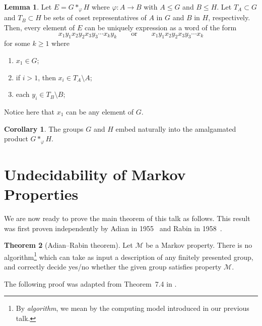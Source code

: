 \documentclass[11pt,a4paper,reqno]{amsart}
\theoremstyle{plain}
\theoremstyle{definition}
\newtheorem{theorem}{Theorem}[section]
\newtheorem{lemma}[theorem]{Lemma}
\newtheorem{corollary}{Corollary}[theorem]
\theoremstyle{definition}
\renewcommand\leq\leqslant
\renewcommand\geq\geqslant
\begin{document}
\begin{lemma}\label{lem:amalgamated-normal-form}
	Let $E = G *_\varphi H$ where $\varphi\colon A\to B$ with $A\leq G$ and $B \leq H$.
	Let $T_A\subset G$ and $T_B \subset H$ be sets of coset representatives of $A$ in $G$ and $B$ in $H$, respectively.
	Then, every element of $E$ can be uniquely expression as a word of the form
	\[
		x_1 y_1 x_2 y_2 x_3 y_3 \cdots x_k y_k
		\qquad\text{or}\qquad
		x_1 y_1 x_2 y_2 x_3 y_3 \cdots x_k
	\]
	for some $k \geq 1$ where
	\begin{enumerate}
		\item $x_1 \in G$;
		\item if $i > 1$, then $x_i \in T_A\setminus A$;
		\item each $y_i \in T_B\setminus B$;
	\end{enumerate}
	Notice here that $x_1$ can be any element of $G$.
\end{lemma}
\begin{corollary}\label{cor:amal-natural-embed}
	The groups $G$ and $H$ embed naturally into the amalgamated product $G*_\varphi H$.
\end{corollary}

\section{Undecidability of Markov Properties}

We are now ready to prove the main theorem of this talk as follows.
This result was first proven independently by Adian in 1955~\cite{adyan1955algorithmic} and Rabin in 1958~\cite{rabin1958recursive}.

\begin{theorem}[Adian–Rabin theorem]\label{thm:aiden-raben}
	Let $\mathcal M$ be a Markov property.
	There is no algorithm\footnote{By \emph{algorithm}, we mean by the computing model introduced in our previous talk.} which can take as input a description of any finitely presented group, and correctly decide yes/no whether the given group satisfies property $\mathcal M$.
\end{theorem}

\smallskip

The following proof was adapted from Theorem~7.4 in \cite{amsinotes}.
\end{document}
